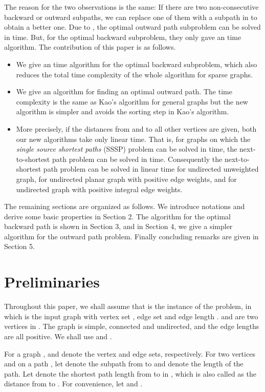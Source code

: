 The reason for the two observations is the same: If there are two non-consecutive backward or outward subpaths, we can replace one of them with a subpath in  to obtain a better one. 
Due to \cite{kao10}, the optimal outward path subproblem can be solved in  time. 
But, for the optimal backward subproblem, they only gave an  time algorithm.
The contribution of this paper is as follows.
\begin{itemize}
\item We give an  time algorithm for the optimal backward subproblem, which also reduces the total time complexity of the whole algorithm for sparse graphs. 
\item We give an algorithm for finding an optimal outward path. The time complexity is the same as Kao's algorithm for general graphs but the new algorithm is simpler and avoids the sorting step in Kao's algorithm.  
\item More precisely, if the distances from  and  to all other vertices are given, both our new algorithms take only linear time.
That is, for graphs on which the \emph{single source shortest paths} (SSSP) problem can be solved in  time, the next-to-shortest path problem can be solved in  time. Consequently the next-to-shortest path problem can be solved in linear time for undirected unweighted graph, for undirected planar graph with positive edge weights, and for undirected graph with positive integral edge weights.
\end{itemize}

The remaining sections are organized as follows. We introduce notations and derive some basic properties in Section 2. The algorithm for the optimal backward path is shown in Section 3, and in Section 4, we give a simpler algorithm for the outward path problem. Finally concluding remarks are given in Section 5. 
 
\section{Preliminaries}

Throughout this paper, we shall assume that  is the instance of the problem, in which  is the input graph with vertex set , edge set  and edge length . 
 and  are two vertices in . The graph  is simple, connected and undirected, and the edge lengths are all positive. We shall use  and .

For a graph ,  and  denote the vertex and edge sets, respectively. 
For two vertices  and  on a path , let  denote the subpath from  to  and  denote the length of the path.
Let  denote the shortest path length from  to  in , which is also called as the distance from  to . 
For convenience, let  and . 

